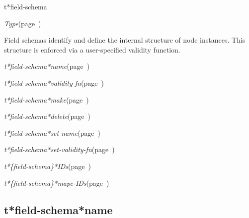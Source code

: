 \begin{description}
\item [Name:]  t*field-schema

\item [Layer:] {\sl Type}\hfill(page~\pageref{Type})

\item [Description:]

Field schemas identify and define the internal structure
of node instances.  This structure is enforced via
a user-specified validity function.

\item [Attributes:]
\item {\sl t*field-schema*name}\hfill(page~\pageref{t*field-schema*name})
\item {\sl t*field-schema*validity-fn}\hfill(page~\pageref{t*field-schema*validity-fn})


\item [Operations:]
\item {\sl t*field-schema*make}\hfill(page~\pageref{t*field-schema*make})
\item {\sl t*field-schema*delete}\hfill(page~\pageref{t*field-schema*delete})
\item {\sl t*field-schema*set-name}\hfill(page~\pageref{t*field-schema*set-name})
\item {\sl t*field-schema*set-validity-fn}\hfill(page~\pageref{t*field-schema*set-validity-fn})

\item {\sl t*\{field-schema\}*IDs}\hfill(page~\pageref{t*field-schema*IDs})
\item {\sl t*\{field-schema\}*mapc-IDs}\hfill(page~\pageref{t*field-schema*mapc-IDs}) 

\item [Subclasses:]


\item [Superclasses:]


\item [Instances:]



\end{description}
\horizontalline

\subsection{t*field-schema*name}
\label{t*field-schema*name}

